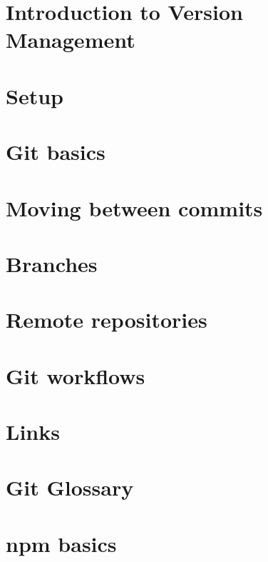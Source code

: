 \documentclass[b5paper,openany]{book}
\begin{document}
\tp

\tableofcontents




\chapter{Introduction to Version Management}


\chapter{Setup}


\chapter{Git basics}


\chapter{Moving between commits}


\chapter{Branches}


\chapter{Remote repositories}


\chapter{Git workflows}


\chapter{Links}


\chapter{Git Glossary}



\chapter{npm basics}



\end{document}
